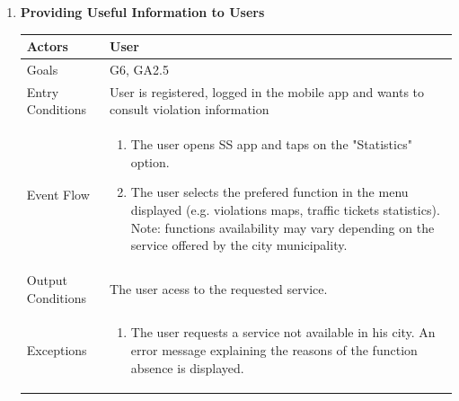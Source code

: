 \begin{enumerate}
	\item \textbf{Providing Useful Information to Users}
		\begin{table}[h!]
		\begin{tabular}{|l|p{}|}
		\hline
		Actors            			&       	User\\ \hline
		Goals             			&         G6, GA2.5\\ \hline
		Entry Conditions  	&  		User is registered, logged in the mobile app and wants to consult violation information\\ \hline
		Event Flow        		&          
				\begin{enumerate}[label=\alph*)]
					\item The user opens SS app and taps on the "Statistics" option.
					\item The user selects the prefered function in the menu displayed (e.g. violations maps, traffic tickets statistics). \newline
								Note: functions availability may vary depending on the service offered by the city municipality.
				\end{enumerate}\\ \hline
		Output Conditions &    		The user acess to the requested service.\\ \hline		
				
		Exceptions        		&       	
				\begin{enumerate}[label=\alph*)]
					\item The user requests a service not available in his city. An error message explaining the reasons of the function absence is displayed.
				\end{enumerate}\\ \hline
	\end{tabular}
	\end{table}
	

\end{enumerate}
